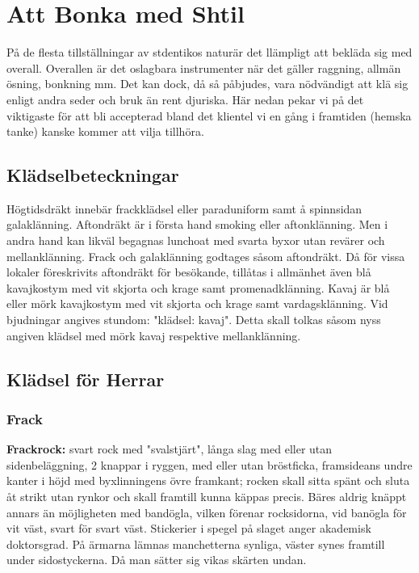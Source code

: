 
\pagestyle{Att Bonka med Shtil}

\section{\textbf{Att Bonka med Shtil}}

    På de flesta tillställningar av stdentikos naturär det llämpligt att bekläda sig med overall. Overallen är det oslagbara instrumenter när det gäller raggning, allmän ösning, bonkning  mm. Det kan dock, då så påbjudes, vara nödvändigt att klä sig enligt andra seder och bruk än rent djuriska. Här nedan pekar vi på det viktigaste för att bli accepterad bland det klientel vi en gång i framtiden (hemska tanke) kanske kommer att vilja tillhöra.

    \subsection{\textbf{Klädselbeteckningar}}
    Högtidsdräkt innebär frackklädsel eller paraduniform samt å spinnsidan galaklänning. Aftondräkt är i första hand smoking eller aftonklänning. Men i andra hand kan likväl begagnas lunchoat med svarta byxor utan revärer och mellanklänning. Frack och galaklänning godtages såsom aftondräkt. Då för vissa lokaler föreskrivits aftondräkt för besökande, tillåtas i allmänhet även blå kavajkostym med vit skjorta och krage samt promenadklänning. Kavaj är blå eller mörk kavajkostym med vit skjorta och krage samt vardagsklänning. Vid bjudningar angives stundom: "klädsel: kavaj". Detta skall tolkas såsom nyss angiven klädsel med mörk kavaj respektive mellanklänning.

    \subsection{\textbf{Klädsel för Herrar}}
    \subsubsection{\textbf{Frack}}
    \textbf{Frackrock:} svart rock med "svalstjärt", långa slag med eller utan sidenbeläggning, 2 knappar i ryggen, med eller utan bröstficka, framsideans undre kanter i höjd med byxlinningens övre framkant; rocken skall sitta spänt och sluta åt strikt utan rynkor och skall framtill kunna käppas precis. Bäres aldrig knäppt annars än möjligheten med bandögla, vilken förenar rocksidorna, vid banögla för vit väst, svart för svart väst. Stickerier i spegel på slaget anger akademisk doktorsgrad. På ärmarna lämnas manchetterna synliga, väster synes framtill under sidostyckerna. Då man sätter sig vikas skärten undan.

